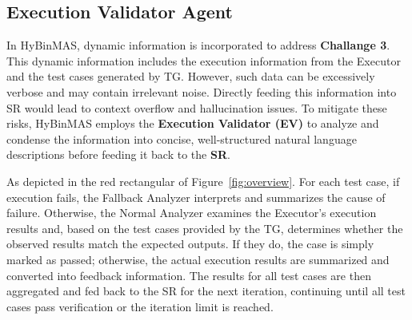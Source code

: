 \documentclass[acmsmall,screen,review,anonymous]{acmart} %
\begin{document}



\subsection{Execution Validator Agent}
\label{sec:ev_design}

In HyBinMAS, dynamic information is incorporated to address \textbf{Challange 3}. This dynamic information includes the execution information from the Executor and the test cases generated by TG. However, such data can be excessively verbose and may contain irrelevant noise. Directly feeding this information into SR would lead to context overflow and hallucination issues. To mitigate these risks, HyBinMAS employs the \textbf{Execution Validator (EV)} to analyze and condense the information into concise, well-structured natural language descriptions before feeding it back to the \textbf{SR}.

As depicted in the red rectangular of Figure~\ref{fig:overview}. For each test case, if execution fails, the Fallback Analyzer interprets and summarizes the cause of failure. Otherwise, the Normal Analyzer examines the Executor’s execution results and, based on the test cases provided by the TG, determines whether the observed results match the expected outputs. If they do, the case is simply marked as passed; otherwise, the actual execution results are summarized and converted into feedback information. The results for all test cases are then aggregated and fed back to the SR for the next iteration, continuing until all test cases pass verification or the iteration limit is reached.
\end{document}
